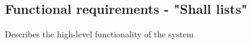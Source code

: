 \documentclass[12pt]{article}
\begin{document}
\subsection{Functional requirements - "Shall lists"}

Describes the high-level functionality of the system\\

\end{document}
